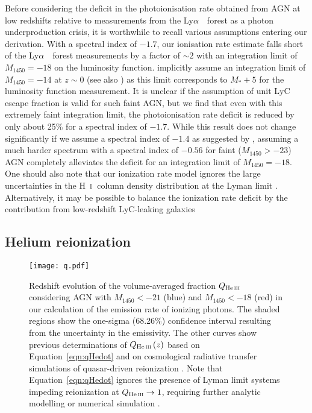 \documentclass[fleqn,usenatbib]{mnras}
\def\lya{Ly$\alpha$~}
\def\HI{\hbox{H~$\scriptstyle\rm I$}}
\begin{document}
Before considering the deficit in the photoionisation rate obtained
from AGN at low redshifts relative to measurements from the
\lya\ forest as a photon underproduction crisis, it is worthwhile to
recall various assumptions entering our derivation.  With a spectral
index of $-1.7$, our ionisation rate estimate falls short of the
\lya\ forest measurements by a factor of $\sim 2$ with an integration
limit of $M_{1450}=-18$ on the luminosity function.
\citet{2015ApJ...813L...8M} implicitly assume an integration limit of
$M_{1450}=-14$ at $z\sim 0$ (see also \citealt{2015MNRAS.451L..30K,
  2018arXiv180104931P}) as this limit corresponds to $M_*+5$ for the
\citet{2009A&A...507..781S} luminosity function measurement.  It is
unclear if the assumption of unit LyC escape fraction is valid for
such faint AGN, but we find that even with this extremely faint
integration limit, the photoionisation rate deficit is reduced by only
about 25\% for a spectral index of $-1.7$.  While this result does not
change significantly if we assume a spectral index of $-1.4$ as
suggested by \citet{2014ApJ...794...75S}, assuming a much harder
spectrum with a spectral index of $-0.56$ \citep{2004ApJ...615..135S}
for faint ($M_{1450}>-23$) AGN completely alleviates the deficit for
an integration limit of $M_{1450}=-18$.  One should also note that our
ionization rate model ignores the large uncertainties in the
\HI\ column density distribution at the Lyman limit
\citep{2011ApJ...736...42R, 2017ApJ...849..106S, 2017MNRAS.466..838G}.  Alternatively, it
may be possible to balance the ionization rate deficit by the
contribution from low-redshift LyC-leaking galaxies
\citep{2016Natur.529..178I, 2018MNRAS.474.4514I, 2018MNRAS.478.4851I}

\subsection{Helium reionization}

\begin{figure}
  \begin{center}
    \texttt{[image: q.pdf]}
  \end{center}
  \caption{Redshift evolution of the volume-averaged 
    fraction $Q_\ion{He}{iii}$ considering AGN with $M_{1450}<-21$
    (blue) and $M_{1450}<-18$ (red) in our calculation of the emission
    rate of ionizing photons.  The shaded regions show the one-sigma
    (68.26\%) confidence interval resulting from the uncertainty in
    the emissivity.  The other curves show previous determinations of
    $Q_\ion{He}{iii}\left(z\right)$ based on
    Equation~\eqref{eqn:qHedot} \citep{2012ApJ...746..125H,
      2015ApJ...813L...8M, 2016ApJ...828...90L, 2018arXiv180104931P}
    and on cosmological radiative transfer simulations of
    quasar-driven  reionization
    \citep{2009ApJ...694..842M, 2014MNRAS.445.4186C}.  Note that
    Equation~\eqref{eqn:qHedot} ignores the presence of 
    Lyman limit systems impeding reionization at
    $Q_\ion{He}{iii}\rightarrow 1$, requiring further analytic
    modelling \citep{2017ApJ...851...50M} or numerical simulation
    \citep{2018arXiv180104931P}.
  \label{fig:qhe}}  
\end{figure}
\end{document}
